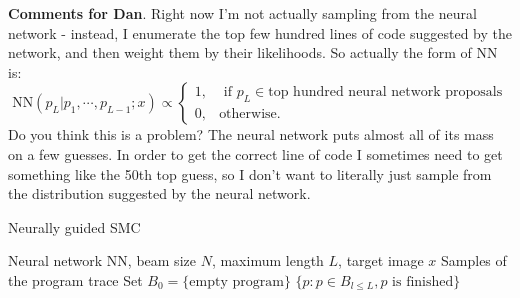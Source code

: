 \documentclass{article}
\newcommand{\probability}{\mathds{P}} %
\begin{document}
\textbf{Comments for Dan}. Right now I'm not actually sampling from
the neural network - instead, I enumerate the top few hundred lines of
code suggested by the network, and then weight them by their
likelihoods.
So actually the form of NN is:
\begin{equation}
  \text{NN}(p_L | p_1,\cdots,p_{L - 1};x)\propto \begin{cases}
    1,&\text{ if }p_L \in \text{top hundred neural network proposals}\\
0,&\text{otherwise}.    \end{cases}
\end{equation}
Do you think this is a problem? The neural network puts almost all of its mass on a few guesses.
In order to get the correct line of code I sometimes need to get something like the 50th  top guess,
so I don't want to literally just sample from the distribution suggested by the neural network.


  \begin{algorithm}[tb]
   \caption{Neurally guided SMC}
   \label{guideAlgorithm}
\begin{algorithmic}
   Neural network NN, beam size $N$, maximum length $L$, target image $x$
   Samples of the program trace
  \STATE Set $B_0 = \{\text{empty program}\}$
  \STATE{ Set $\tilde{w}(r_n) = \frac{L(x|r_n)}{L(x|p_n)}\times\frac{\probability [p'_n]}{\probability [p'_n = \text{NN}(\text{render}(p),x)]}$}
  \ENDFOR
  \ENDFOR
   $\{p : p\in B_{l\leq L}, p \text{ is finished}\}$
\end{algorithmic}
  \end{algorithm}



{\small }
\end{document}
